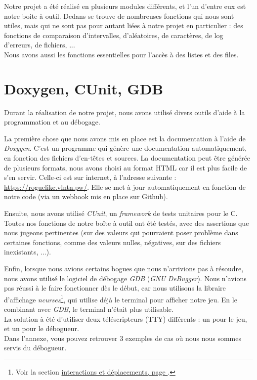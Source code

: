 \documentclass[11pt]{report}
\begin{document}
		Notre projet a été réalisé en plusieurs modules différents, et l'un d'entre eux est notre boite à outil. Dedans se trouve de nombreuses fonctions qui nous sont utiles, mais qui ne sont pas pour autant liées à notre projet en particulier : des fonctions de comparaison d'intervalles, d'aléatoires, de caractères, de log d'erreurs, de fichiers, ...\\
		Nous avons aussi les fonctions essentielles pour l'accès à des listes et des files.

	\section{Doxygen, CUnit, GDB}\label{gdb}
	
		Durant la réalisation de notre projet, nous avons utilisé divers outils d'aide à la programmation et au débogage. 
		
		\vspace{12pt}		
		
		La première chose que nous avons mis en place est la documentation à l'aide de \emph{Doxygen}. C'est un programme qui génère une documentation automatiquement, en fonction des fichiers d'en-têtes et sources. La documentation peut être générée de plusieurs formats, nous avons choisi au format HTML car il est plus facile de s'en servir. Celle-ci est sur internet, à l'adresse suivante : \url{https://roguelike.vlntn.pw/}. Elle se met à jour automatiquement en fonction de notre code (via un webhook mis en place sur Github).
		
		\vspace{12pt}
		
		Ensuite, nous avons utilisé \emph{CUnit}, un \emph{framework} de tests unitaires pour le C. Toutes nos fonctions de notre boîte à outil ont été testés, avec des assertions que nous jugeons pertinentes (sur des valeurs qui pourraient poser problème dans certaines fonctions, comme des valeurs nulles, négatives, sur des fichiers inexistants, ...).
		
		\vspace{12pt}
		
		Enfin, lorsque nous avions certains bogues que nous n'arrivions pas à résoudre, nous avons utilisé le logiciel de débogage \emph{GDB} (\emph{GNU DeBugger}). Nous n'avions pas réussi à le faire fonctionner dès le début, car nous utilisons la libraire d'affichage \emph{ncurses}\footnote{Voir la section \hyperref[ncurses]{interactions et déplacements, page }.}, qui utilise déjà le terminal pour afficher notre jeu. En le combinant avec \emph{GDB}, le terminal n'était plus utilisable.\\
		La solution à été d'utiliser deux téléscripteurs (\textsc{TTY}) différents : un pour le jeu, et un pour le débogueur.\\
		Dans l'annexe, vous pouvez retrouver 3 exemples de cas où nous nous sommes servis du débogueur.
\end{document}
